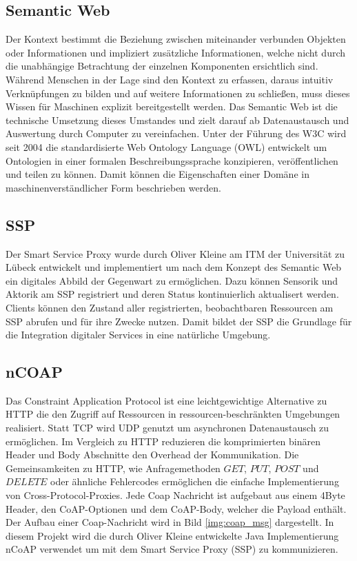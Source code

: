 \subsection{Semantic Web}

Der Kontext bestimmt die Beziehung zwischen miteinander verbunden Objekten oder Informationen und impliziert zusätzliche Informationen, welche nicht durch die unabhängige Betrachtung der einzelnen Komponenten ersichtlich sind. Während Menschen in der Lage sind den Kontext zu erfassen, daraus intuitiv Verknüpfungen zu bilden und auf weitere Informationen zu schließen, muss dieses Wissen für Maschinen explizit bereitgestellt werden. Das Semantic Web ist die technische Umsetzung dieses Umstandes und zielt darauf ab Datenaustausch und Auswertung durch Computer zu vereinfachen. Unter der Führung des W3C wird seit 2004 die standardisierte Web Ontology Language (OWL) entwickelt um Ontologien in einer formalen Beschreibungssprache konzipieren, veröffentlichen und teilen zu können. Damit können die Eigenschaften einer Domäne in maschinenverständlicher Form beschrieben werden.

\subsection{SSP}

Der Smart Service Proxy wurde durch Oliver Kleine am ITM der Universität zu Lübeck entwickelt und implementiert um nach dem Konzept des Semantic Web ein digitales Abbild der Gegenwart zu ermöglichen. Dazu können Sensorik und Aktorik am SSP registriert und deren Status kontinuierlich aktualisert werden. Clients können den Zustand aller registrierten, beobachtbaren Ressourcen am SSP abrufen und für ihre Zwecke nutzen. Damit bildet der SSP die Grundlage für die Integration digitaler Services in eine natürliche Umgebung.  

\subsection{nCOAP}
\label{subsec:ncoap}

Das Constraint Application Protocol ist eine leichtgewichtige Alternative zu HTTP die den Zugriff auf Ressourcen in ressourcen-beschränkten Umgebungen realisiert. Statt TCP wird UDP genutzt um asynchronen Datenaustausch zu ermöglichen. Im Vergleich zu HTTP reduzieren die komprimierten binären Header und Body Abschnitte den Overhead der Kommunikation. Die Gemeinsamkeiten zu HTTP, wie Anfragemethoden $GET$, $PUT$, $POST$ und $DELETE$ oder ähnliche Fehlercodes ermöglichen die einfache Implementierung von Cross-Protocol-Proxies. Jede Coap Nachricht ist aufgebaut aus einem 4Byte Header, den CoAP-Optionen und dem CoAP-Body, welcher die Payload enthält. Der Aufbau einer Coap-Nachricht wird in Bild \ref{img:coap_msg} dargestellt. In diesem Projekt wird die durch Oliver Kleine entwickelte Java Implementierung nCoAP verwendet um mit dem Smart Service Proxy (SSP) zu kommunizieren. 


